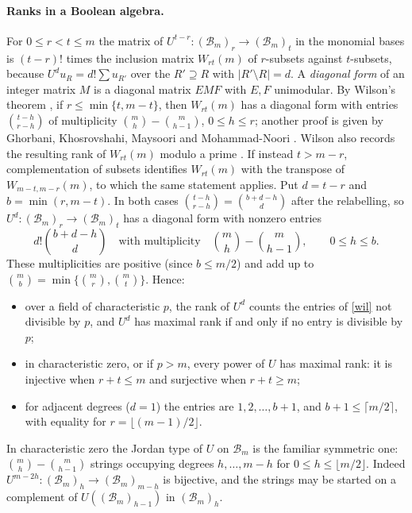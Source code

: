 \documentclass[11pt,a4paper]{article}
\theoremstyle{definition}
\newcommand{\B}{\mathcal B}
\begin{document}
\paragraph{Ranks in a Boolean algebra.}
For $0\le r<t\le m$ the matrix of $U^{t-r}:(\B_m)_r\to(\B_m)_t$ in the monomial bases is $(t-r)!$ times the inclusion matrix $W_{rt}(m)$ of $r$-subsets against $t$-subsets, because $U^{d}u_R=d!\sum u_{R'}$ over the $R'\supseteq R$ with $|R'\setminus R|=d$. A \emph{diagonal form} of an integer matrix $M$ is a diagonal matrix $EMF$ with $E,F$ unimodular. By Wilson's theorem \cite[Theorem~2]{Wilson}, if $r\le\min\{t,m-t\}$, then $W_{rt}(m)$ has a diagonal form with entries $\binom{t-h}{r-h}$ of multiplicity $\binom mh-\binom m{h-1}$, $0\le h\le r$; another proof is given by Ghorbani, Khosrovshahi, Maysoori and Mohammad-Noori \cite[Corollary~3]{GKMM}. Wilson also records the resulting rank of $W_{rt}(m)$ modulo a prime \cite[Theorem~1]{Wilson}. If instead $t>m-r$, complementation of subsets identifies $W_{rt}(m)$ with the transpose of $W_{m-t,m-r}(m)$, to which the same statement applies. Put $d=t-r$ and $b=\min(r,m-t)$. In both cases $\binom{t-h}{r-h}=\binom{b+d-h}{d}$ after the relabelling, so $U^{d}:(\B_m)_r\to(\B_m)_t$ has a diagonal form with nonzero entries
\begin{equation}\label{wil}
 d!\binom{b+d-h}{d}\quad\text{with multiplicity}\quad \binom mh-\binom m{h-1},\qquad 0\le h\le b .
\end{equation}
These multiplicities are positive (since $b\le m/2$) and add up to $\binom mb=\min\{\binom mr,\binom mt\}$. Hence:
\begin{itemize}
\item over a field of characteristic $p$, the rank of $U^d$ counts the entries of \eqref{wil} not divisible by $p$, and $U^d$ has maximal rank if and only if no entry is divisible by $p$;
\item in characteristic zero, or if $p>m$, every power of $U$ has maximal rank: it is injective when $r+t\le m$ and surjective when $r+t\ge m$;
\item for adjacent degrees ($d=1$) the entries are $1,2,\dots,b+1$, and $b+1\le\lceil m/2\rceil$, with equality for $r=\lfloor (m-1)/2\rfloor$.
\end{itemize}
In characteristic zero the Jordan type of $U$ on $\B_m$ is the familiar symmetric one: $\binom mh-\binom m{h-1}$ strings occupying degrees $h,\dots,m-h$ for $0\le h\le\lfloor m/2\rfloor$. Indeed $U^{m-2h}:(\B_m)_h\to(\B_m)_{m-h}$ is bijective, and the strings may be started on a complement of $U((\B_m)_{h-1})$ in $(\B_m)_h$.
\end{document}
